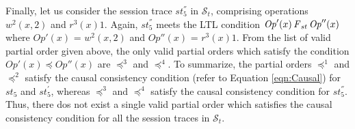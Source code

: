 \documentclass[journal,compsoc]{IEEEtran}
\begin{document}
 \par Finally, let us consider the session trace $\mathit{st}_5^{''}$  in $\mathcal{S}_t$, comprising operations $w^2(x,2)$ and $r^3(x){1}$. Again, $\mathit{st}_5^{''}$ meets the LTL condition ${\mathit{Op}}'(x) \operatorname{\it F}_\mathit{st} {\mathit{Op}}''(x)$ where ${\mathit{Op}}'(x)$ = $w^2(x,2)$ and  ${\mathit{Op}}''(x)$ = $r^3(x){1}$.  From the list of valid partial order given above, the only valid partial orders which satisfy the condition ${\mathit{Op}}'(x) \preccurlyeq {\mathit{Op}}''(x)$ are  $\preccurlyeq^3$ and $\preccurlyeq^4$.  To summarize, the partial orders $\preccurlyeq^1$ and $\preccurlyeq^2$ satisfy the causal consistency condition (refer to Equation \ref{eqn:Causal}) for $\mathit{st}_5$ and $\mathit{st}_5^{'}$, whereas $\preccurlyeq^3$ and $\preccurlyeq^4$ satisfy the causal consistency condition for $\mathit{st}_5^{''}$. Thus, there dos not exist a single valid partial order which satisfies the causal consistency  condition for all the session traces in $\mathcal{S}_t$.
\end{document}
